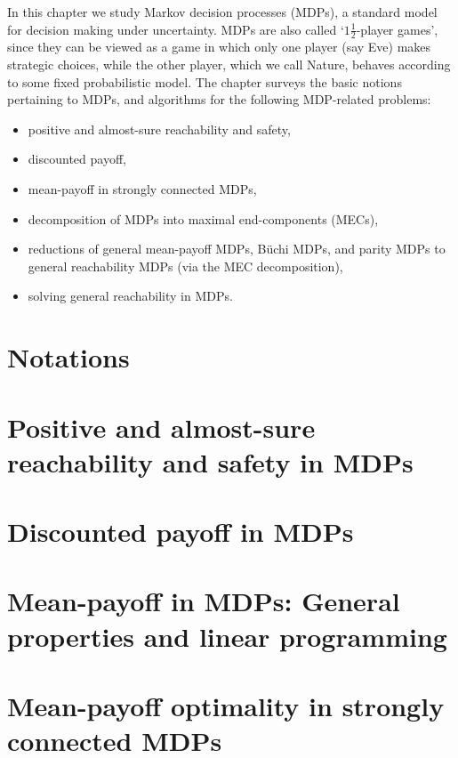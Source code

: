 

In this chapter we study Markov decision processes (MDPs), a standard model for decision making under uncertainty. MDPs are also called `$1\frac{1}{2}$-player games', since they can be viewed as a game in which only one player (say Eve) makes strategic choices, while the other player, which we call Nature, behaves according to some fixed probabilistic model. The chapter surveys the basic notions pertaining to MDPs, and algorithms for the following MDP-related problems:

\begin{itemize}
\item positive and almost-sure reachability and safety,
\item discounted payoff,
\item mean-payoff in strongly connected MDPs,
\item decomposition of MDPs into maximal end-components (MECs),
\item reductions of general mean-payoff MDPs, B{\"u}chi MDPs, and parity MDPs to general reachability MDPs (via the MEC decomposition),
\item solving general reachability in MDPs.
\end{itemize}

\section*{Notations}
\label{5-sec:notations}


\section{Positive and almost-sure reachability and safety in MDPs}
\label{5-sec:reachability}


\section{Discounted payoff in MDPs}
\label{5-sec:discounted}


\section{Mean-payoff in MDPs: General properties and linear programming}
\label{5-sec:mean_payoff_properties}


\section{Mean-payoff optimality in strongly connected MDPs}
\label{5-sec:mean_payoff_strongly_connected}


